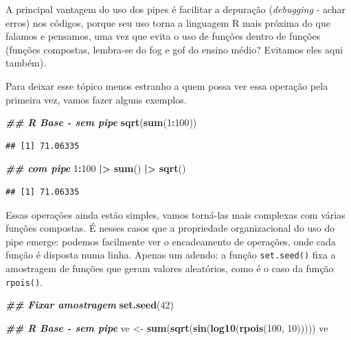 \documentclass[
]{article}
\newenvironment{Shaded}{\begin{snugshade}}{\end{snugshade}}
\newcommand{\DecValTok}[1]{\textcolor[rgb]{0.00,0.00,0.81}{#1}}
\newcommand{\DocumentationTok}[1]{\textcolor[rgb]{0.56,0.35,0.01}{\textbf{\textit{#1}}}}
\newcommand{\FunctionTok}[1]{\textcolor[rgb]{0.13,0.29,0.53}{\textbf{#1}}}
\newcommand{\NormalTok}[1]{#1}
\newcommand{\OtherTok}[1]{\textcolor[rgb]{0.56,0.35,0.01}{#1}}
\newcommand{\SpecialCharTok}[1]{\textcolor[rgb]{0.81,0.36,0.00}{\textbf{#1}}}
\begin{document}
A principal vantagem do uso dos pipes é facilitar a depuração (\emph{debugging} - achar erros) nos códigos, porque seu uso torna a linguagem R mais próxima do que falamos e pensamos, uma vez que evita o uso de funções dentro de funções (funções compostas, lembra-se do fog e gof do ensino médio? Evitamos eles aqui também).

Para deixar esse tópico menos estranho a quem possa ver essa operação pela primeira vez, vamos fazer alguns exemplos.

\begin{Shaded}
\begin{Highlighting}[]
\DocumentationTok{\#\# R Base {-} sem pipe}
\FunctionTok{sqrt}\NormalTok{(}\FunctionTok{sum}\NormalTok{(}\DecValTok{1}\SpecialCharTok{:}\DecValTok{100}\NormalTok{))}
\end{Highlighting}
\end{Shaded}

\begin{verbatim}
## [1] 71.06335
\end{verbatim}

\begin{Shaded}
\begin{Highlighting}[]
\DocumentationTok{\#\# com pipe}
\DecValTok{1}\SpecialCharTok{:}\DecValTok{100} \SpecialCharTok{|\textgreater{}} 
    \FunctionTok{sum}\NormalTok{() }\SpecialCharTok{|\textgreater{}} 
    \FunctionTok{sqrt}\NormalTok{()}
\end{Highlighting}
\end{Shaded}

\begin{verbatim}
## [1] 71.06335
\end{verbatim}

Essas operações ainda estão simples, vamos torná-las mais complexas com várias funções compostas. É nesses casos que a propriedade organizacional do uso do pipe emerge: podemos facilmente ver o encadeamento de operações, onde cada função é disposta numa linha. Apenas um adendo: a função \texttt{set.seed()} fixa a amostragem de funções que geram valores aleatórios, como é o caso da função \texttt{rpois()}.

\begin{Shaded}
\begin{Highlighting}[]
\DocumentationTok{\#\# Fixar amostragem}
\FunctionTok{set.seed}\NormalTok{(}\DecValTok{42}\NormalTok{)}

\DocumentationTok{\#\# R Base {-} sem pipe}
\NormalTok{ve }\OtherTok{\textless{}{-}} \FunctionTok{sum}\NormalTok{(}\FunctionTok{sqrt}\NormalTok{(}\FunctionTok{sin}\NormalTok{(}\FunctionTok{log10}\NormalTok{(}\FunctionTok{rpois}\NormalTok{(}\DecValTok{100}\NormalTok{, }\DecValTok{10}\NormalTok{)))))}
\NormalTok{ve}
\end{Highlighting}
\end{Shaded}
\end{document}
